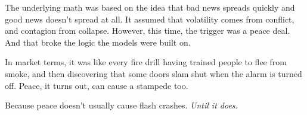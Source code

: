 \medskip


The underlying math was based on the idea 
that bad news spreads quickly and good news doesn’t spread at all. It assumed that volatility comes from conflict, 
and contagion from collapse. However, this time, the trigger was a peace deal. And that 
broke the logic the models were built on.

In market terms, it was like every fire drill having trained people to flee from smoke, and then discovering 
that some doors slam shut when the alarm is turned off.  Peace, it turns out, can cause a stampede too.

Because peace doesn’t usually cause flash crashes. \textit{Until it does.}




